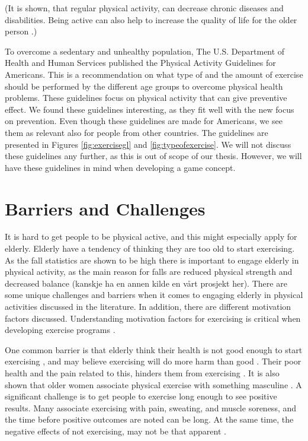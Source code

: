(It is shown, that regular physical activity, can decrease chronic diseases and disabilities. Being active can also help to increase the quality of life for the older person \cite{schutzer}.)
 
To overcome a sedentary and unhealthy population, The U.S. Department of Health and Human Services published the Physical Activity Guidelines for 
Americans. This is a recommendation on what type of and the amount of exercise should be performed by the different age groups to overcome physical health problems. These guidelines focus on physical activity that can give preventive effect. We found these guidelines interesting, as they fit well with the new focus on prevention. Even though these guidelines are made for Americans, we see them as relevant also for people from other countries. The guidelines are presented in Figures \ref{fig:exercisegl} and \ref{fig:typeofexercise}. We will not discuss these guidelines any further, as this is out of scope of our thesis. However, we will have these guidelines in mind when developing a game concept.

\section{Barriers and Challenges}
\label{sec:barriers}
It is hard to get people to be physical active, and this might especially apply for elderly. Elderly have a tendency of thinking they are too old to start exercising. As the fall statistics are shown to be high there is important to engage elderly in physical activity, as the main reason for falls are reduced physical strength and decreased balance \cite{project} (kanskje ha en annen kilde en vårt prosjekt her). There are some unique challenges and barriers when it comes to engaging elderly in physical activities discussed in the literature. In addition, there are different motivation factors discussed. Understanding motivation factors for exercising is critical when developing exercise programs \cite{chao}.

One common barrier is that elderly think their health is not good enough to start exercising \cite{schutzer}, and may believe exercising will do more harm than good \cite{chao}. Their poor health and the pain related to this, hinders them from exercising \cite{schutzer}. It is also shown that older women associate physical exercise with something masculine \cite{chao}. A significant challenge is to get people to exercise long enough to see positive results. Many associate exercising with pain, sweating, and muscle soreness, and the time before positive outcomes are noted can be long. At the same time, the negative effects of not exercising, may not be that apparent \cite{chao}. 

